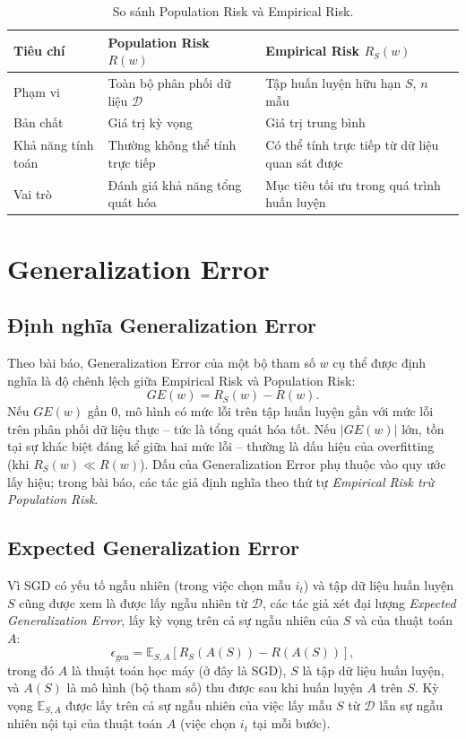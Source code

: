 \begin{table}[H]
\centering
\caption{So sánh Population Risk và Empirical Risk.}
\label{tab:sosanh-risk}
\begin{tabular}{|p{2.6cm}|p{5.3cm}|p{5.3cm}|}
\hline
\textbf{Tiêu chí} & \textbf{Population Risk $R(w)$} & \textbf{Empirical Risk $R_S(w)$} \\ \hline
Phạm vi & Toàn bộ phân phối dữ liệu $\mathcal{D}$ & Tập huấn luyện hữu hạn $S$, $n$ mẫu \\ \hline
Bản chất & Giá trị kỳ vọng & Giá trị trung bình \\ \hline
Khả năng tính toán & Thường không thể tính trực tiếp & Có thể tính trực tiếp từ dữ liệu quan sát được \\ \hline
Vai trò & Đánh giá khả năng tổng quát hóa & Mục tiêu tối ưu trong quá trình huấn luyện \\ \hline
\end{tabular}
\end{table}

\section{Generalization Error}
\label{sec:generr}

\subsection{Định nghĩa Generalization Error}

Theo bài báo, Generalization Error của một bộ tham số $w$ cụ thể được định nghĩa là độ chênh lệch giữa Empirical Risk và Population Risk:
\[
GE(w) = R_S(w) - R(w).
\]
Nếu $GE(w)$ gần $0$, mô hình có mức lỗi trên tập huấn luyện gần với mức lỗi trên phân phối dữ liệu thực -- tức là tổng quát hóa tốt. Nếu $|GE(w)|$ lớn, tồn tại sự khác biệt đáng kể giữa hai mức lỗi -- thường là dấu hiệu của overfitting (khi $R_S(w) \ll R(w)$). Dấu của Generalization Error phụ thuộc vào quy ước lấy hiệu; trong bài báo, các tác giả định nghĩa theo thứ tự \textit{Empirical Risk trừ Population Risk}.

\subsection{Expected Generalization Error}

Vì SGD có yếu tố ngẫu nhiên (trong việc chọn mẫu $i_t$) và tập dữ liệu huấn luyện $S$ cũng được xem là được lấy ngẫu nhiên từ $\mathcal{D}$, các tác giả xét đại lượng \textit{Expected Generalization Error}, lấy kỳ vọng trên cả sự ngẫu nhiên của $S$ và của thuật toán $A$:
\[
\epsilon_{\mathrm{gen}} = \mathbb{E}_{S, A}\left[R_S(A(S)) - R(A(S))\right],
\]
trong đó $A$ là thuật toán học máy (ở đây là SGD), $S$ là tập dữ liệu huấn luyện, và $A(S)$ là mô hình (bộ tham số) thu được sau khi huấn luyện $A$ trên $S$. Kỳ vọng $\mathbb{E}_{S,A}$ được lấy trên cả sự ngẫu nhiên của việc lấy mẫu $S$ từ $\mathcal{D}$ lẫn sự ngẫu nhiên nội tại của thuật toán $A$ (việc chọn $i_t$ tại mỗi bước).

